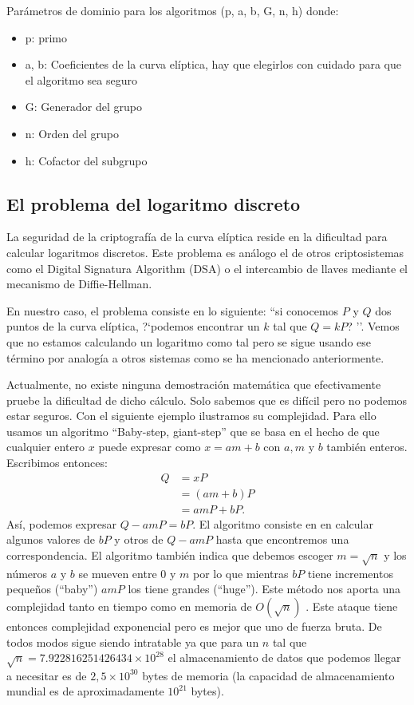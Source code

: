 \documentclass[11pt]{article}
\begin{document}
Parámetros de dominio para los algoritmos (p, a, b, G, n, h) donde:
\begin{itemize}
	\item p: primo
	\item a, b: Coeficientes de la curva elíptica, hay que elegirlos con cuidado para que el algoritmo sea seguro
	\item G: Generador del grupo
	\item n: Orden del grupo
	\item h: Cofactor del subgrupo
\end{itemize}
\subsection{El problema del logaritmo discreto}
La seguridad de la criptografía de la curva elíptica reside en la dificultad para calcular logaritmos discretos. Este problema es análogo el de otros criptosistemas como el Digital Signatura Algorithm (DSA) o el intercambio de llaves mediante el mecanismo de Diffie-Hellman.

En nuestro caso, el problema consiste en lo siguiente: ``si conocemos $ P $ y $ Q $ dos puntos de la curva elíptica, ?`podemos encontrar un $ k $ tal que $ Q = kP $? ''. Vemos que no estamos calculando un logaritmo como tal pero se sigue usando ese término por analogía a otros sistemas como se ha mencionado anteriormente. 

Actualmente, no existe ninguna demostración matemática que efectivamente pruebe la dificultad de dicho cálculo. Solo sabemos que es difícil pero no podemos estar seguros. Con el siguiente ejemplo ilustramos su complejidad. Para ello usamos un algoritmo ``Baby-step, giant-step'' que se basa en el hecho de que cualquier entero $ x $ puede expresar como $ x = am+b $ con $ a,m \text{ y } b$ también enteros. Escribimos entonces:
\begin{equation*}
\begin{split}
Q &= xP \\
  &= (am+b)P\\
  &=amP + bP.
\end{split}
\end{equation*}
Así, podemos expresar $ Q - amP  = bP $. El algoritmo consiste en en calcular algunos valores de $ bP $ y otros de $ Q-amP $ hasta que encontremos una correspondencia. El algoritmo también indica que debemos escoger $ m = \sqrt{n} $ y los números $ a $ y $ b $ se mueven entre 0 y $ m $ por lo que mientras $ bP $ tiene incrementos pequeños (``baby'') $ amP $ los tiene grandes (``huge''). Este método nos aporta una complejidad tanto en tiempo como en memoria de $ O(\sqrt{n}) $ . Este ataque tiene entonces complejidad exponencial pero es mejor que uno de fuerza bruta. De todos modos sigue siendo intratable ya que para un $  n  $ tal que $ \sqrt{n} = 7.922816251426434 \times 10^{28} $ el almacenamiento de datos que podemos llegar a necesitar es de $ 2,5\times10^{30} $ bytes de memoria (la capacidad de almacenamiento mundial es de aproximadamente $ 10^{21} $ bytes).
\end{document}
